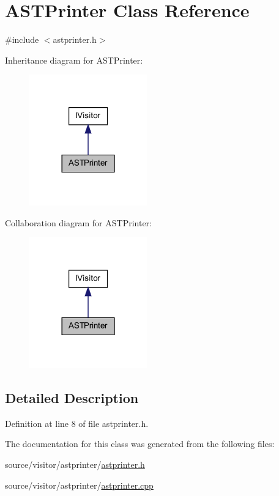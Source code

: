 \hypertarget{class_a_s_t_printer}{
\section{ASTPrinter Class Reference}
\label{class_a_s_t_printer}
}


{\ttfamily \#include $<$astprinter.h$>$}



Inheritance diagram for ASTPrinter:\nopagebreak
\begin{figure}[H]
\begin{center}
\leavevmode
\includegraphics[width=144pt]{class_a_s_t_printer__inherit__graph}
\end{center}
\end{figure}


Collaboration diagram for ASTPrinter:\nopagebreak
\begin{figure}[H]
\begin{center}
\leavevmode
\includegraphics[width=144pt]{class_a_s_t_printer__coll__graph}
\end{center}
\end{figure}


\subsection{Detailed Description}


Definition at line 8 of file astprinter.h.



The documentation for this class was generated from the following files:\begin{DoxyCompactItemize}
\item 
source/visitor/astprinter/\hyperlink{astprinter_8h}{astprinter.h}\item 
source/visitor/astprinter/\hyperlink{astprinter_8cpp}{astprinter.cpp}\end{DoxyCompactItemize}
